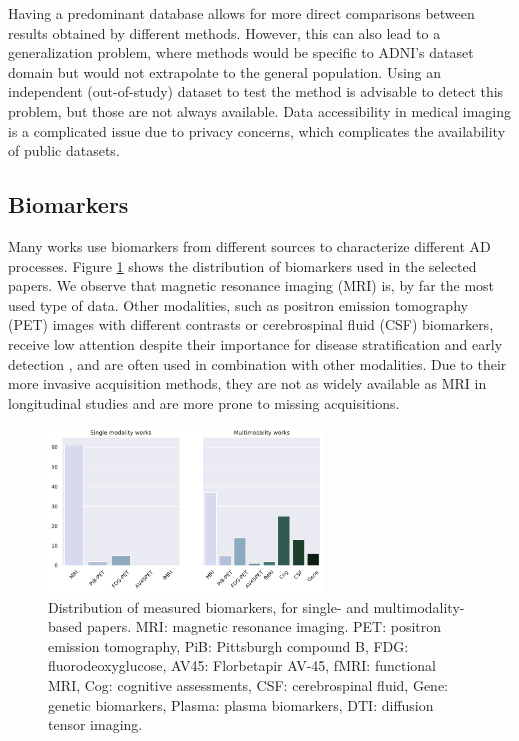 Having a predominant database allows for more direct comparisons between results obtained by different methods. However, this can also lead to a generalization problem, where methods would be specific to ADNI's dataset domain but would not extrapolate to the general population. Using an independent (out-of-study) dataset to test the method is advisable to detect this problem, but those are not always available. Data accessibility in medical imaging is a complicated issue due to privacy concerns, which complicates the availability of public datasets. \\

\subsection{Biomarkers}

Many works use biomarkers from different sources to characterize different AD processes. Figure \ref{fig:modalities} shows the distribution of biomarkers used in the selected papers. We observe that magnetic resonance imaging (MRI) is, by far the most used type of data. Other modalities, such as positron emission tomography (PET) images with different contrasts or cerebrospinal fluid (CSF) biomarkers, receive low attention despite their importance for disease stratification and early detection \cite{Andreasen1999,Clark2011,Weiner2005}, and are often used in combination with other modalities. Due to their more invasive acquisition methods, they are not as widely available as MRI in longitudinal studies and are more prone to missing acquisitions. \\

\begin{figure}[!htbp]
\centering
\includegraphics[width=0.65\textwidth]{figures/review/Fig6.pdf}
    \caption[Distribution of measured biomarkers, for single- and multimodality papers.]{\small Distribution of measured biomarkers, for single- and multimodality-based papers. MRI:  magnetic resonance imaging. PET: positron emission tomography, PiB: Pittsburgh compound B, FDG: fluorodeoxyglucose, AV45: Florbetapir AV-45, fMRI: functional MRI, Cog: cognitive assessments, CSF: cerebrospinal fluid, Gene: genetic biomarkers, Plasma: plasma biomarkers, DTI: diffusion tensor imaging.}\label{fig:modalities}
\end{figure}

